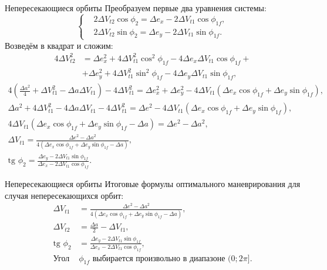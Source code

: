 \documentclass[9pt]{beamer}
\begin{document}
\begin{frame}{Непересекающиеся орбиты}
Преобразуем первые два уравнения системы:
\begin{equation*}
    \left\{
    \begin{aligned}
      &2 \Delta V_{t2} \cos \phi_{2} = \Delta e_x - 2 \Delta V_{t1} \cos \phi_{1f}, \\
      &2 \Delta V_{t2} \sin \phi_{2} = \Delta e_y - 2 \Delta V_{t1} \sin \phi_{1f}.
    \end{aligned}
    \right.
\end{equation*}
Возведём в квадрат и сложим:
\begin{align*}
    4 \Delta V_{t2}^2 &= \Delta e_x^2 + 4 \Delta V_{t1}^2 \cos^2 \phi_{1f} - 4 \Delta e_x \Delta V_{t1} \cos \phi_{1f} + \\ 
    &+ \Delta e_y^2 + 4 \Delta V_{t1}^2 \sin^2 \phi_{1f} - 4 \Delta e_y \Delta V_{t1} \sin \phi_{1f},
\end{align*}
\begin{gather*}
    4 \left( \frac{\Delta a^2}{4} + \Delta V_{t1}^2 - \Delta a \Delta V_{t1} \right) - 4 \Delta V_{t1}^2 = \Delta e_x^2 + \Delta e_y^2 - 4 \Delta V_{t1} \left( \Delta e_x \cos \phi_{1f} + \Delta e_y \sin \phi_{1f} \right), \\
    \Delta a^2 + 4 \Delta V_{t1}^2 - 4 \Delta a \Delta V_{t1} - 4 \Delta V_{t1}^2 = \Delta e^2 - 4 \Delta V_{t1} \left( \Delta e_x \cos \phi_{1f} + \Delta e_y \sin \phi_{1f} \right), \\
    4 \Delta V_{t1} \left( \Delta e_x \cos \phi_{1f} + \Delta e_y \sin \phi_{1f} - \Delta a \right) = \Delta e^2 - \Delta a^2, \\
    \Delta V_{t1} = \frac{\Delta e^2 - \Delta a^2}{4 \left( \Delta e_x \cos \phi_{1f} + \Delta e_y \sin \phi_{1f} - \Delta a \right)}, \\
    \text{tg } \phi_2 = \frac{\Delta e_y - 2 \Delta V_{t1} \sin \phi_{1f}}{\Delta e_x - 2 \Delta V_{t1} \cos \phi_{1f}}.
\end{gather*}
\end{frame}

\begin{frame}{Непересекающиеся орбиты}
Итоговые формулы оптимального маневрирования для случая непересекающихся орбит:
\begin{equation*}
\boxed{
    \begin{aligned}
        \Delta V_{t1} &= \frac{\Delta e^2 - \Delta a^2}{4 \left( \Delta e_x \cos \phi_{1f} + \Delta e_y \sin \phi_{1f} - \Delta a \right)}, \\
        \Delta V_{t2} &= \frac{\Delta a}{2} - \Delta V_{t1}, \\
        \text{tg } \phi_2 &= \frac{\Delta e_y - 2 \Delta V_{t1} \sin \phi_{1f}}{\Delta e_x - 2 \Delta V_{t1} \cos \phi_{1f}}, \\
        \text{Угол } &\phi_{1f} \text{ выбирается произвольно в диапазоне } (0; 2\pi].
    \end{aligned}
}
\end{equation*}
\end{frame}
\end{document}
